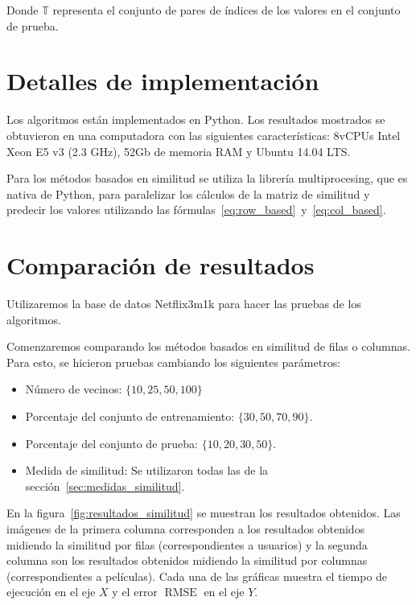 \documentclass[spanish]{article}                 %
\numberwithin{equation}{section}                 %
\theoremstyle{definition}
\DeclareMathOperator{\RMSE}{RMSE}
\begin{document}
Donde $\mathds{T}$ representa el conjunto de pares de índices de los valores en el conjunto de prueba.

\section{Detalles de implementación}
Los algoritmos están implementados en Python. Los resultados mostrados se obtuvieron en una computadora con las siguientes características: 8vCPUs Intel Xeon E5 v3 (2.3 GHz), 52Gb de memoria RAM y Ubuntu 14.04 LTS.

Para los métodos basados en similitud se utiliza la librería multiprocesing, que es nativa de Python, para paralelizar los cálculos de la matriz de similitud y predecir los valores utilizando las fórmulas~\ref{eq:row_based}~y~\ref{eq:col_based}.


\section{Comparación de resultados}
Utilizaremos la base de datos Netflix3m1k para hacer las pruebas de los algoritmos.

Comenzaremos comparando los métodos basados en similitud de filas o columnas. Para esto, se hicieron pruebas cambiando los siguientes parámetros:
\begin{itemize}
    \item Número de vecinos: $\{10, 25, 50, 100\}$
    \item Porcentaje del conjunto de entrenamiento: $\{30, 50, 70, 90\}$.
    \item Porcentaje del conjunto de prueba: $\{10, 20, 30, 50\}$.
    \item Medida de similitud: Se utilizaron todas las de la sección~\ref{sec:medidas_similitud}.
\end{itemize}
En la figura~\ref{fig:resultados_similitud} se muestran los resultados obtenidos. Las imágenes de la primera columna corresponden a los resultados obtenidos midiendo la similitud por filas (correspondientes a usuarios) y la segunda columna son los resultados obtenidos midiendo la similitud por columnas (correspondientes a películas). Cada una de las gráficas muestra el tiempo de ejecución en el eje $X$ y el error $\RMSE$ en el eje $Y$.
\end{document}
